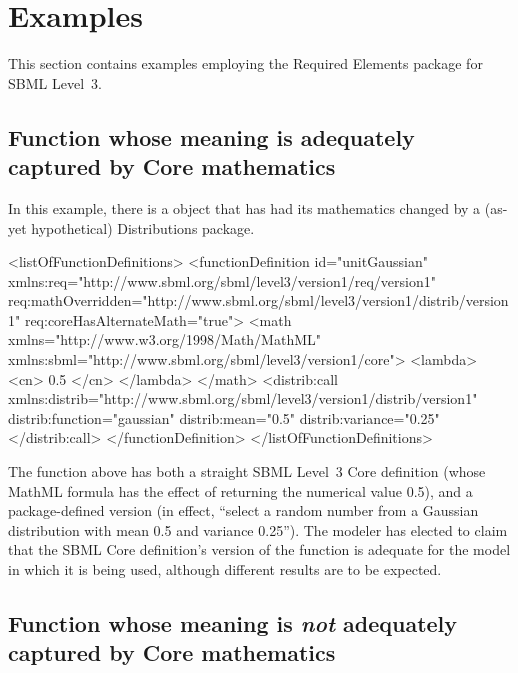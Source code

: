 
\section{Examples}
\label{examples}

This section contains examples employing the Required Elements package for SBML Level~3.

\subsection{Function whose meaning is adequately captured by Core mathematics}

In this example, there is a \FunctionDefinition object that has had its mathematics changed by a (as-yet hypothetical) Distributions package.

\begin{example}
<listOfFunctionDefinitions> 
  <functionDefinition id="unitGaussian" 
                      xmlns:req="http://www.sbml.org/sbml/level3/version1/req/version1"
                      req:mathOverridden="http://www.sbml.org/sbml/level3/version1/distrib/version1" 
                      req:coreHasAlternateMath="true"> 
    <math xmlns="http://www.w3.org/1998/Math/MathML" 
          xmlns:sbml="http://www.sbml.org/sbml/level3/version1/core"> 
       <lambda>
         <cn> 0.5 </cn>
       </lambda>
    </math> 
    <distrib:call xmlns:distrib="http://www.sbml.org/sbml/level3/version1/distrib/version1"
                  distrib:function="gaussian" distrib:mean="0.5" distrib:variance="0.25"
    </distrib:call> 
  </functionDefinition> 
</listOfFunctionDefinitions> 
\end{example}

The function  above has both a straight SBML Level~3 Core definition (whose MathML formula has the effect of returning the numerical value 0.5), and a package-defined version (in effect, ``select a random number from a Gaussian distribution with mean 0.5 and variance 0.25''). The modeler has elected to claim that the SBML Core definition's version of the function is adequate for the model in which it is being used, although different results are to be expected.


\subsection{Function whose meaning is \emph{not} adequately captured by Core mathematics}

